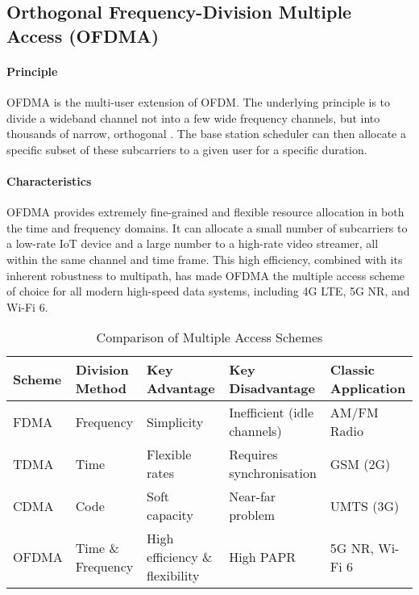 \subsection{Orthogonal Frequency-Division Multiple Access (OFDMA)}

\paragraph{Principle}
OFDMA is the multi-user extension of OFDM. The underlying principle is to divide a wideband channel not into a few wide frequency channels, but into thousands of narrow, orthogonal . The base station scheduler can then allocate a specific subset of these subcarriers to a given user for a specific duration.

\paragraph{Characteristics}
OFDMA provides extremely fine-grained and flexible resource allocation in both the time and frequency domains. It can allocate a small number of subcarriers to a low-rate IoT device and a large number to a high-rate video streamer, all within the same channel and time frame. This high efficiency, combined with its inherent robustness to multipath, has made OFDMA the multiple access scheme of choice for all modern high-speed data systems, including 4G LTE, 5G NR, and Wi-Fi 6.

\begin{table}[ht]
    \centering
    \caption{Comparison of Multiple Access Schemes}
    \label{tab:ma-comparison}
    \begin{tabularx}{\textwidth}{@{}lXXXX@{}}
        \toprule
        \textbf{Scheme} & \textbf{Division Method} & \textbf{Key Advantage} & \textbf{Key Disadvantage} & \textbf{Classic Application} \\
        \midrule
        FDMA & Frequency & Simplicity & Inefficient (idle channels) & AM/FM Radio \\
        TDMA & Time & Flexible rates & Requires synchronisation & GSM (2G) \\
        CDMA & Code & Soft capacity & Near-far problem & UMTS (3G) \\
        OFDMA & Time \& Frequency & High efficiency \& flexibility & High PAPR & 5G NR, Wi-Fi 6 \\
        \bottomrule
    \end{tabularx}
\end{table}

